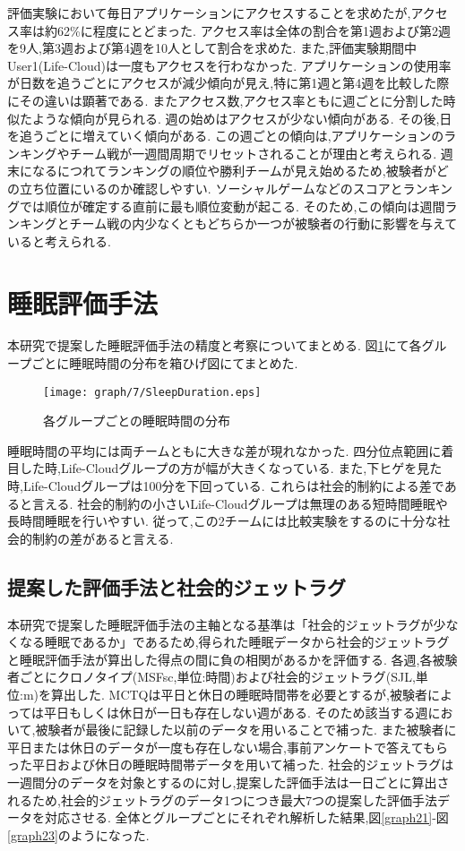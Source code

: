 評価実験において毎日アプリケーションにアクセスすることを求めたが,アクセス率は約62\%に程度にとどまった.
アクセス率は全体の割合を第1週および第2週を9人,第3週および第4週を10人として割合を求めた.
また,評価実験期間中User1(Life-Cloud)は一度もアクセスを行わなかった.
アプリケーションの使用率が日数を追うごとにアクセスが減少傾向が見え,特に第1週と第4週を比較した際にその違いは顕著である.
またアクセス数,アクセス率ともに週ごとに分割した時似たような傾向が見られる.
週の始めはアクセスが少ない傾向がある.
その後,日を追うごとに増えていく傾向がある.
この週ごとの傾向は,アプリケーションのランキングやチーム戦が一週間周期でリセットされることが理由と考えられる.
週末になるにつれてランキングの順位や勝利チームが見え始めるため,被験者がどの立ち位置にいるのか確認しやすい.
ソーシャルゲームなどのスコアとランキングでは順位が確定する直前に最も順位変動が起こる.
そのため,この傾向は週間ランキングとチーム戦の内少なくともどちらか一つが被験者の行動に影響を与えていると考えられる.

\newpage

\section{睡眠評価手法}
本研究で提案した睡眠評価手法の精度と考察についてまとめる.
図\ref{sleepdurationbox}にて各グループごとに睡眠時間の分布を箱ひげ図にてまとめた.
\begin{figure}[tbp]
	\begin{center}
		\texttt{[image: graph/7/SleepDuration.eps]}
		\caption{各グループごとの睡眠時間の分布}
		\label{sleepdurationbox}
	\end{center}
\end{figure}
睡眠時間の平均には両チームともに大きな差が現れなかった.
四分位点範囲に着目した時,Life-Cloudグループの方が幅が大きくなっている.
また,下ヒゲを見た時,Life-Cloudグループは100分を下回っている.
これらは社会的制約による差であると言える.
社会的制約の小さいLife-Cloudグループは無理のある短時間睡眠や長時間睡眠を行いやすい.
従って,この2チームには比較実験をするのに十分な社会的制約の差があると言える.

\subsection{提案した評価手法と社会的ジェットラグ}
本研究で提案した睡眠評価手法の主軸となる基準は「社会的ジェットラグが少なくなる睡眠であるか」であるため,得られた睡眠データから社会的ジェットラグと睡眠評価手法が算出した得点の間に負の相関があるかを評価する.
各週,各被験者ごとにクロノタイプ(MSFsc,単位:時間)および社会的ジェットラグ(SJL,単位:m)を算出した.
MCTQは平日と休日の睡眠時間帯を必要とするが,被験者によっては平日もしくは休日が一日も存在しない週がある.
そのため該当する週において,被験者が最後に記録した以前のデータを用いることで補った.
また被験者に平日または休日のデータが一度も存在しない場合,事前アンケートで答えてもらった平日および休日の睡眠時間帯データを用いて補った.
社会的ジェットラグは一週間分のデータを対象とするのに対し,提案した評価手法は一日ごとに算出されるため,社会的ジェットラグのデータ1つにつき最大7つの提案した評価手法データを対応させる.
全体とグループごとにそれぞれ解析した結果,図\ref{graph21}-図\ref{graph23}のようになった.

